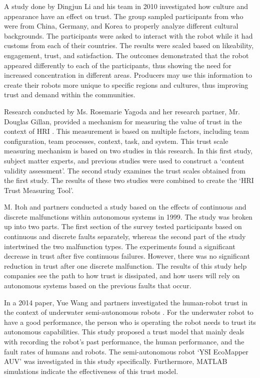 \documentclass[runningheads,a4paper]{llncs}
\begin{document}
A study done by Dingjun Li and his team in 2010 investigated how culture and appearance have an effect on trust\cite{li2010cross}.  The group sampled participants from who were from China, Germany, and Korea to properly analyze different cultural backgrounds.  The participants were asked to interact with the robot while it had customs from each of their countries.  The results were scaled based on likeability, engagement, trust, and satisfaction.  The outcomes demonstrated that the robot appeared differently to each of the participants, thus showing the need for increased concentration in different areas.  Producers may use this information to create their robots more unique to specific regions and cultures, thus improving trust and demand within the communities.

Research conducted by Ms. Rosemarie Yagoda and her research partner, Mr. Douglas Gillan, provided a mechanism for measuring the value of trust in the context of HRI \cite{yagoda2012you}. This measurement is based on multiple factors, including team configuration, team processes, context, task, and system. This trust scale measuring mechanism is based on two studies in this research. In this first study, subject matter experts, and previous studies were used to construct a `content validity assessment'. The second study examines the trust scales obtained from the first study. The results of these two studies were combined to create the `HRI Trust Measuring Tool'.


M. Itoh and partners conducted a study based on the effects of continuous and discrete malfunctions within autonomous systems in 1999\cite{itoh1999trust}.  The study was broken up into two parts.  The first section of the survey tested participants based on continuous and discrete faults separately, whereas the second part of the study intertwined the two malfunction types.  The experiments found a significant decrease in trust after five continuous failures.  However, there was no significant reduction in trust after one discrete malfunction.  The results of this study help companies see the path to how trust is dissipated, and how users will rely on autonomous systems based on the previous faults that occur.


In a 2014 paper, Yue Wang and partners investigated the human-robot trust in the context of underwater semi-autonomous robots \cite{wang2014human}. For the underwater robot to have a good performance, the person who is operating the robot needs to trust its autonomous capabilities. This study proposed a trust model that mainly deals with recording the robot's past performance, the human performance, and the fault rates of humans and robots. The semi-autonomous robot `YSI EcoMapper AUV' was investigated in this study specifically. Furthermore, MATLAB simulations indicate the effectiveness of this trust model.
\end{document}
